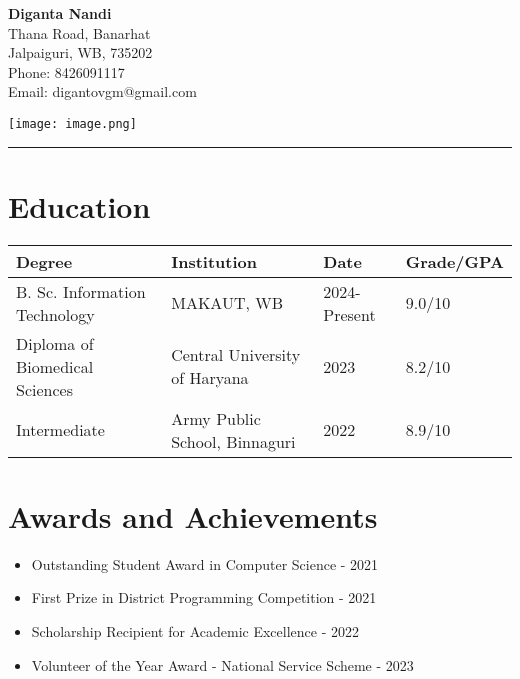 \documentclass[11pt,a4paper]{article}
\begin{document}
\begin{minipage}[c]{0.7\textwidth}
{\LARGE \textbf{Diganta Nandi}}\\[0.2cm]
Thana Road, Banarhat\\
Jalpaiguri, WB, 735202\\
Phone: 8426091117\\
Email: digantovgm@gmail.com
\end{minipage}
\hfill
\begin{minipage}[c]{0.25\textwidth}
\centering
\texttt{[image: image.png]}
\end{minipage}

\vspace{0.3cm}
\hrule
\vspace{0.5cm}

\section*{Education}
\begin{tabular}{|p{3cm}|p{4cm}|p{3cm}|p{3cm}|}
\hline
\textbf{Degree} & \textbf{Institution} & \textbf{Date} & \textbf{Grade/GPA} \\
\hline
B. Sc. Information Technology & MAKAUT, WB & 2024-Present & 9.0/10 \\
\hline
Diploma of Biomedical Sciences & Central University of Haryana & 2023 & 8.2/10 \\
\hline
Intermediate & Army Public School, Binnaguri & 2022 & 8.9/10 \\
\hline
\end{tabular}

\vspace{0.5cm}

\section*{Awards and Achievements}
\begin{itemize}
\item Outstanding Student Award in Computer Science - 2021
\item First Prize in District Programming Competition - 2021
\item Scholarship Recipient for Academic Excellence - 2022
\item Volunteer of the Year Award - National Service Scheme - 2023
\end{itemize}

\vspace{0.5cm}
\end{document}
